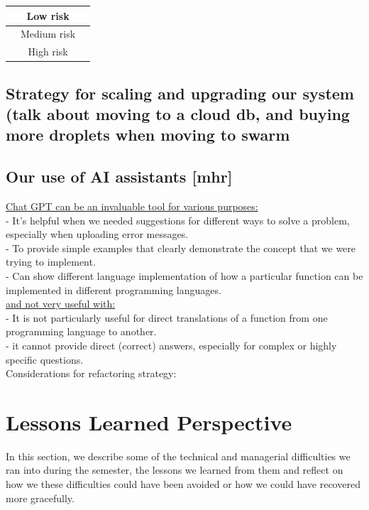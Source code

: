 \documentclass{article}
\begin{document}
\begin{table}[h!]
\centering
\begin{tabular}{|c|c|c|}
\hline
\cellcolor{green} & Low risk \\
\hline
\cellcolor{yellow} & Medium risk \\
\hline
\cellcolor{red} & High risk \\
\hline
\end{tabular}
\end{table}



\subsection{Strategy for scaling and upgrading our system (talk about moving to a cloud db, and buying more droplets when moving to swarm}

\subsection{Our use of AI assistants [mhr]}
\noindent \underline{Chat GPT can be an invaluable tool for various purposes:} \\
- It's helpful when we needed suggestions for different ways to solve a problem, especially when uploading error messages.\\
- To provide simple examples that clearly demonstrate the concept that we were trying to implement.\\
- Can show different language implementation of how a particular function can be implemented in different programming languages.
\\

\noindent \underline{and not very useful with:}\\
- It is not particularly useful for direct translations of a function from one programming language to another.\\
- it cannot provide direct (correct) answers, especially for complex or highly specific questions.\\

Considerations for refactoring strategy:

\section{Lessons Learned Perspective}
In this section, we describe some of the technical and managerial difficulties we ran into during the semester, the lessons we learned from them and reflect on how we these difficulties could have been avoided or how we could have recovered more gracefully.
\end{document}

